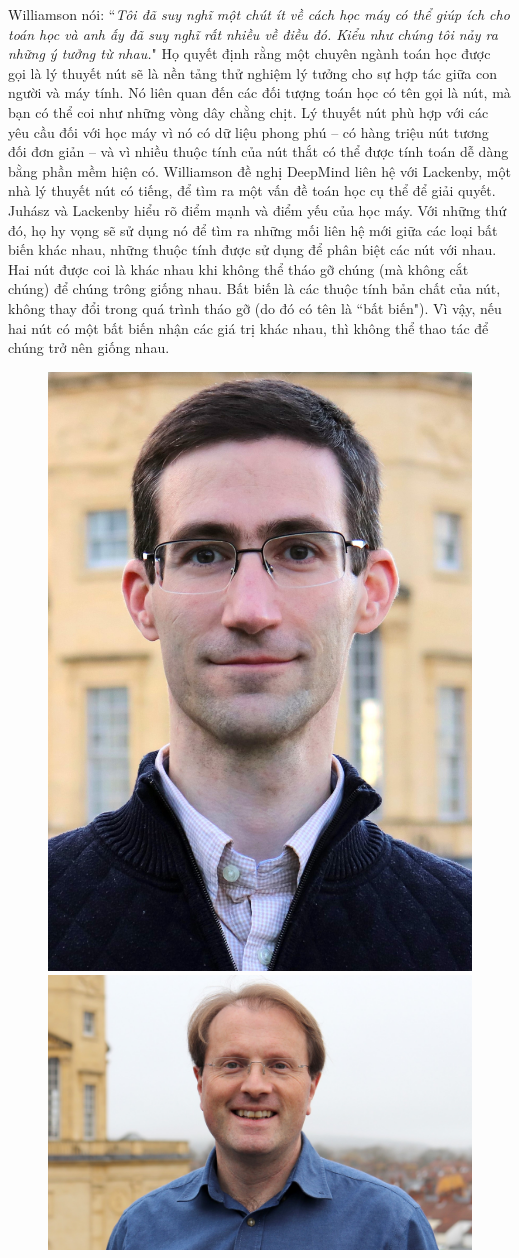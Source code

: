 \begin{multicols}{2}
	\vskip 0.05cm
	Williamson nói: ``\textit{Tôi đã suy nghĩ một chút ít về cách học máy có thể giúp ích cho toán học và anh ấy đã suy nghĩ rất nhiều về điều đó. Kiểu như chúng tôi nảy ra những ý tưởng từ nhau.}"
	\vskip 0.05cm
	Họ quyết định rằng một chuyên ngành toán học được gọi là lý thuyết nút sẽ là nền tảng thử nghiệm lý tưởng cho sự hợp tác giữa con người và máy tính. Nó liên quan đến các đối tượng toán học có tên gọi là nút, mà bạn có thể coi như những vòng dây chằng chịt. Lý thuyết nút phù hợp với các yêu cầu đối với học máy vì nó có dữ liệu phong phú -- có hàng triệu nút tương đối đơn giản -- và vì nhiều thuộc tính của nút thắt có thể được tính toán dễ dàng bằng phần mềm hiện có.
	\vskip 0.05cm
	Williamson đề nghị DeepMind liên hệ với Lackenby, một nhà lý thuyết nút có tiếng, để tìm ra một vấn đề toán học cụ thể để giải quyết.
	\vskip 0.05cm	
	Juhász và Lackenby hiểu rõ điểm mạnh và điểm yếu của học máy. Với những thứ đó, họ hy vọng sẽ sử dụng nó để tìm ra những mối liên hệ mới giữa các loại bất biến khác nhau, những thuộc tính được sử dụng để phân biệt các nút với nhau.
	\vskip 0.05cm
	Hai nút được coi là khác nhau khi không thể tháo gỡ chúng (mà không cắt chúng) để chúng trông giống nhau. Bất biến là các thuộc tính bản chất của nút, không thay đổi trong quá trình tháo gỡ (do đó có tên là ``bất biến"). Vì vậy, nếu hai nút có một bất biến nhận các giá trị khác nhau, thì không thể thao tác để chúng trở nên giống nhau.
	\begin{figure}[H]
		\centering
		\vspace*{-5pt}
		\captionsetup{labelformat= empty, justification=centering}
		\includegraphics[height=0.425\linewidth]{3}
		\includegraphics[height=0.425\linewidth]{4}

\end{figure}
\end{multicols}
